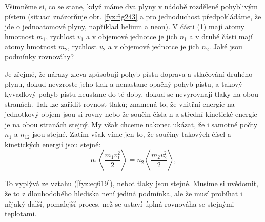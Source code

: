     Všimněme si, co se stane, když máme dva plyny v nádobě rozdělené pohyblivým pístem (situaci
    znázorňuje obr. \ref{fyz:fig243} a pro jednoduchost předpokládáme, že jde o jednoatomové plyny,
    například helium a neon). V části (1) mají atomy hmotnost \(m_1\), rychlost \(v_1\) a v objemové
    jednotce je jich \(n_1\) a v druhé části mají atomy hmotnost \(m_2\), rychlost \(v_2\) a v
    objemové jednotce je jich \(n_2\). Jaké jsou podmínky rovnováhy?
    
    Je zřejmé, že nárazy zleva způsobují pohyb pístu doprava a stlačování druhého plynu, dokud
    nevzroste jeho tlak a nenastane opačný pohyb pístu, a takový kyvadlový pohyb pístu neustane do
    té doby, dokud se nevyrovnají tlaky na obou stranách. Tak lze zařídit rovnost tlaků; znamená to,
    že vnitřní energie na jednotkový objem jsou si rovny nebo že součin čísla n a střední kinetické
    energie je na obou stranách stejný. My však chceme nakonec ukázat, že i samotné počty \(n_1\) a
    \(n_12\) jsou stejné. Zatím však víme jen to, že součiny takových čísel a kinetických energií
    jsou stejné:    
    \begin{equation*}
      n_1\left\langle\frac{m_1v^2_1}{2}\right\rangle=n_2\left\langle\frac{m_2v^2_2}{2}\right\rangle,
    \end{equation*}
    
    To vyplývá ze vztahu (\ref{fyz:eq619}), neboť tlaky jsou stejné. Musíme si uvědomit, že to z
    dlouhodobého hlediska není jediná podmínka, ale že musí probíhat i nějaký další, pomalejší
    proces, než se ustaví úplná rovnováha se stejnými teplotami.
    
